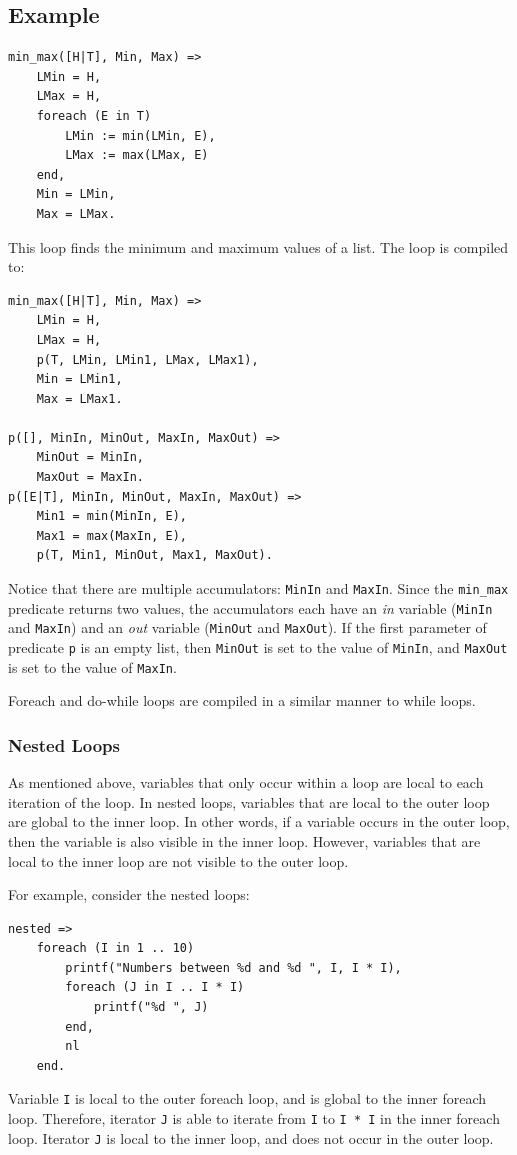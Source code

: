 \subsection*{Example}
\begin{verbatim}
min_max([H|T], Min, Max) =>
    LMin = H,
    LMax = H,
    foreach (E in T)
        LMin := min(LMin, E),
        LMax := max(LMax, E)
    end,
    Min = LMin,
    Max = LMax.
\end{verbatim}

This loop finds the minimum and maximum values of a list.  The loop is compiled to:
\begin{verbatim}
min_max([H|T], Min, Max) =>
    LMin = H,
    LMax = H,
    p(T, LMin, LMin1, LMax, LMax1),
    Min = LMin1,
    Max = LMax1.

p([], MinIn, MinOut, MaxIn, MaxOut) =>
    MinOut = MinIn,
    MaxOut = MaxIn.
p([E|T], MinIn, MinOut, MaxIn, MaxOut) =>
    Min1 = min(MinIn, E),
    Max1 = max(MaxIn, E),
    p(T, Min1, MinOut, Max1, MaxOut).
\end{verbatim}
Notice that there are multiple accumulators: \texttt{MinIn} and \texttt{MaxIn}.  Since the \texttt{min\_max} predicate returns two values, the accumulators each have an \textit{in} variable (\texttt{MinIn} and \texttt{MaxIn}) and an \textit{out} variable (\texttt{MinOut} and \texttt{MaxOut}).   If the first parameter of predicate \texttt{p} is an empty list, then \texttt{MinOut} is set to the value of \texttt{MinIn}, and \texttt{MaxOut} is set to the value of \texttt{MaxIn}.

Foreach and do-while loops are compiled in a similar manner to while loops.

\subsubsection{Nested Loops}
As mentioned above, variables that only occur within a loop are local to each iteration of the loop.  In nested loops, variables that are local to the outer loop are global to the inner loop.  In other words, if a variable occurs in the outer loop, then the variable is also visible in the inner loop.  However, variables that are local to the inner loop are not visible to the outer loop.

For example, consider the nested loops:
\begin{verbatim}
nested =>
    foreach (I in 1 .. 10)
        printf("Numbers between %d and %d ", I, I * I),
        foreach (J in I .. I * I)
            printf("%d ", J)
        end,
        nl
    end.
\end{verbatim}
Variable \texttt{I} is local to the outer foreach loop, and is global to the inner foreach loop.  Therefore, iterator \texttt{J} is able to iterate from \texttt{I} to \texttt{I * I} in the inner foreach loop.  Iterator \texttt{J} is local to the inner loop, and does not occur in the outer loop.

